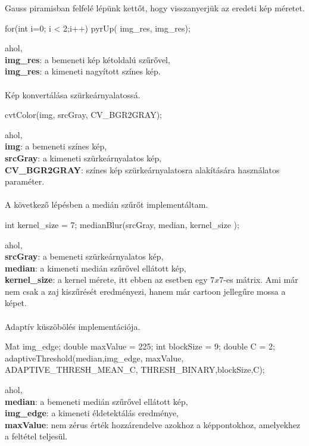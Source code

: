Gauss piramisban felfelé lépünk kettőt, hogy visszanyerjük az eredeti kép méretet.
\begin{cpp}
 for(int i=0; i < 2;i++){
    pyrUp( img_res, img_res);
    }
\end{cpp}
ahol, \\
\indent \textbf{img\_res}: a bemeneti kép kétoldalú szűrővel,\\
\indent \textbf{img\_res}: a kimeneti nagyított színes kép.\\\\
Kép konvertálása szürkeárnyalatossá. 
\begin{cpp}
cvtColor(img, srcGray, CV_BGR2GRAY);
\end{cpp}
ahol, \\
\indent \textbf{img}: a bemeneti színes kép,\\
\indent \textbf{srcGray}: a kimeneti szürkeárnyalatos kép,\\
\indent \textbf{CV\_BGR2GRAY}: színes kép szürkeárnyalatosra alakítására használatos paraméter.\\ \\
A következő lépésben a medián szűrőt implementáltam.
\begin{cpp}
int kernel_size = 7;
medianBlur(srcGray, median, kernel_size );
\end{cpp}
ahol, \\
\indent \textbf{srcGray}: a bemeneti szürkeárnyalatos kép,\\
\indent \textbf{median}: a kimeneti medián szűrővel ellátott kép,\\
\indent \textbf{kernel\_size}: a kernel mérete, itt ebben az esetben egy $7 x 7$-es mátrix. Ami már nem csak a zaj kiszűrését eredményezi, hanem már cartoon jellegűre mossa a képet.\\ \\
Adaptív küszöbölés implementációja.
\begin{cpp}
Mat img_edge;
double maxValue = 225;
int blockSize = 9;
double C = 2; 
adaptiveThreshold(median,img_edge, maxValue, ADAPTIVE_THRESH_MEAN_C,
		THRESH_BINARY,blockSize,C); 
\end{cpp}
ahol, \\
\indent \textbf{median}: a bemeneti medián szűrővel ellátott kép,\\
\indent \textbf{img\_edge}: a kimeneti éldetektálás eredménye,\\
\indent \textbf{maxValue}: nem zérus érték hozzárendelve azokhoz a képpontokhoz, amelyekhez a feltétel teljesül.\\ 
